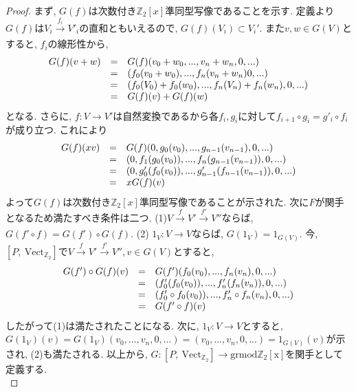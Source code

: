 \documentclass[a4paper]{jsarticle}
\theoremstyle{definition}
\newcommand{\Fun}[2]{[#1,~#2]}
\newcommand{\Vect}{{\mathrm{Vect}}}
\newcommand{\grmodZ}{{\mathrm{grmod \mathbb{Z}_2[x]}}}
\begin{document}
\begin{proof}
    まず, $G(f)$は次数付き$\mathbb{Z}_2[x]$準同型写像であることを示す. 定義より$G(f)$は$V_i\xrightarrow[]{f_i} V'_i$の直和ともいえるので, $G(f)(V_i)\subset V_i'$. また$ v, w\in G(V)$とすると, $f_i$の線形性から, 
\begin{equation}
    \begin{array}{lll}
      G(f)(v+w)   &  =&G(f)(v_0+w_0,...,v_n+w_n,0,...) \\
         &  =&(f_0(v_0+w_0),...,f_n(v_n+w_n)0,...)\\
         &  =&(f_0(V_0)+f_0(w_0),...,f_n(V_n)+f_n(w_n),0,...)\\
         &  =&G(f)(v)+G(f)(w)\notag
    \end{array}
\end{equation}
となる. さらに, $f:V\rightarrow V'$は自然変換であるから各$f_i, g_i$に対して$f_{i+1}\circ g_i=g'_i\circ f_{i}$が成り立つ. これにより
\begin{equation}
    \begin{array}{lll}
      G(f)(xv)   &  =&G(f)(0, g_0(v_0),..., g_{n-1}(v_{n-1}),0,...) \\
         &  =&(0, f_1(g_0(v_0)),..., f_n(g_{n-1}(v_{n-1})),0,...)\\
         &  =&(0, g'_0(f_0(v_0)),..., g'_{n-1}(f_{n-1}(v_{n-1})),0,...)\\
         &  =& xG(f)(v) \notag
    \end{array}
\end{equation}
よって$G(f)$は次数付き$\mathbb{Z}_2[x]$準同型写像であることが示された. 
次に$F$が関手となるため満たすべき条件は二つ. (1)$V\xrightarrow[]{f}V'\xrightarrow[]{f'}V''$ならば, $G(f'\circ f) = G(f')\circ G(f)$. (2) $1_V:V\rightarrow V$ならば, $G(1_V)=1_{G(V)}$. 今, $\Fun{P}{\Vect_{\mathbb{Z}_2}}$で$V\xrightarrow[]{f}V'\xrightarrow[]{f'}V'', v\in G(V)$とすると, 
\begin{equation}
    \begin{array}{lll}
      G(f')\circ G(f)(v)   &  =&G(f')(f_0(v_0), ..., f_n(v_n),0,...) \\
         &  =&(f'_0(f_0(v_0)), ..., f'_n(f_n(v_n)),0,...)\\
         &  =&(f'_0\circ f_0(v_0)), ..., f'_n\circ f_n(v_n),0,...)\\
         &  =&G(f'\circ f)(v)\notag
    \end{array}
\end{equation}
したがって(1)は満たされたことになる. 次に, $1_V:V\rightarrow V$とすると, $G(1_V)(v)=G(1_V)(v_0, ..., v_n,0,...)=(v_0, ..., v_n,0,...)=1_{G(V)}(v)$が示され, (2)も満たされる. 以上から, $G:\Fun{P}{\Vect_{\mathbb{Z}_2}}\rightarrow \grmodZ$を関手として定義する.\\
\end{proof}
 
\end{document}
